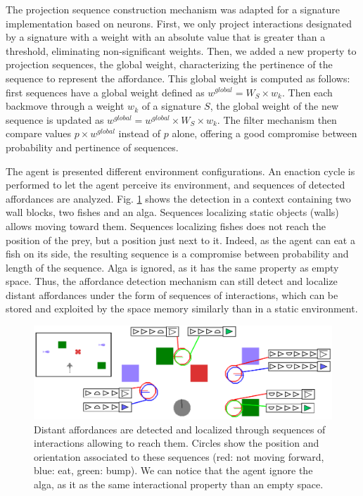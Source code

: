 \documentclass[conference]{IEEEtran}
\begin{document}
The projection sequence construction mechanism was adapted for a signature implementation based on neurons. First, we only project interactions designated by a signature with a weight with an absolute value that is greater than a threshold, eliminating non-significant weights. Then, we added a new property to projection sequences, the global weight, characterizing the pertinence of the sequence to represent the affordance. This global weight is computed as follows: first sequences have a global weight defined as $w^{global} = W_S \times w_k$. Then each backmove through a weight $w_k$ of a signature $S$, the global weight of the new sequence is updated as $w^{global}=w^{global} \times  W_S \times w_k$. The filter mechanism then compare values $p \times w^{global}$ instead of $p$ alone, offering a good compromise between probability and pertinence of sequences.


The agent is presented different environment configurations. An enaction cycle is performed to let the agent perceive its environment, and sequences of detected affordances are analyzed.
Fig. \ref{fig:detect} shows the detection in a context containing two wall blocks, two fishes and an alga. Sequences localizing static objects (walls) allows moving toward them. Sequences localizing fishes does not reach the position of the prey, but a position just next to it. Indeed, as the agent can eat a fish on its side, the resulting sequence is a compromise between probability and length of the sequence. Alga is ignored, as it has the same property as empty space. Thus, the affordance detection mechanism can still detect and localize distant affordances under the form of sequences of interactions, which can be stored and exploited by the space memory similarly than in a static environment.



\begin{figure}[htbp]
\centerline{\includegraphics[scale=0.4]{img/detection.pdf}}
\caption{Distant affordances are detected and localized through sequences of interactions allowing to reach them. Circles show the position and orientation associated to these sequences (red: not moving forward, blue: eat, green: bump). We can notice that the agent ignore the alga, as it as the same interactional property than an empty space.}
\label{fig:detect}
\end{figure}
\end{document}
